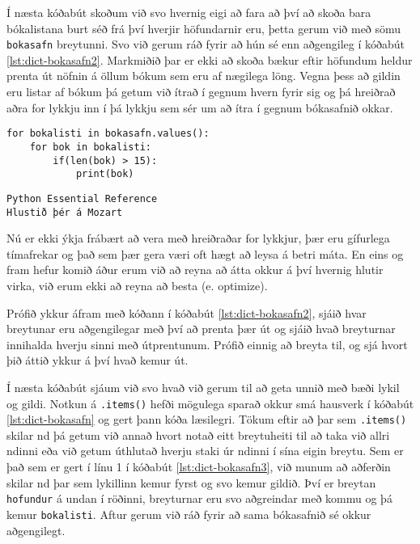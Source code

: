 Í næsta kóðabút skoðum við svo hvernig eigi að fara að því að skoða bara bókalistana burt séð frá því hverjir höfundarnir eru, þetta gerum við með sömu \texttt{bokasafn} breytunni.
Svo við gerum ráð fyrir að hún sé enn aðgengileg í kóðabút \ref{lst:dict-bokasafn2}.
Markmiðið þar er ekki að skoða bækur eftir höfundum heldur prenta út nöfnin á öllum bókum sem eru af nægilega löng.
Vegna þess að gildin eru listar af bókum þá getum við ítrað í gegnum hvern fyrir sig og þá hreiðrað aðra for lykkju inn í þá lykkju sem sér um að ítra í gegnum bókasafnið okkar.
		
\begin{lstlisting}[caption=Ítrun í gegnum orðabækur með .values(), label=lst:dict-bokasafn2]
for bokalisti in bokasafn.values():
	for bok in bokalisti:
		if(len(bok) > 15):
			print(bok)
\end{lstlisting}
\lstset{style=uttak}
\begin{lstlisting}
Python Essential Reference
Hlustið þér á Mozart
\end{lstlisting}
\lstset{style=venjulegt}

Nú er ekki ýkja frábært að vera með hreiðraðar for lykkjur, þær eru gífurlega tímafrekar og það sem þær gera væri oft hægt að leysa á betri máta.
En eins og fram hefur komið áður erum við að reyna að átta okkur á því hvernig hlutir virka, við erum ekki að reyna að besta (e. optimize).

Prófið ykkur áfram með kóðann í kóðabút \ref{lst:dict-bokasafn2}, sjáið hvar breytunar eru aðgengilegar með því að prenta þær út og sjáið hvað breyturnar innihalda hverju sinni með útprentunum.
Prófið einnig að breyta til, og sjá hvort þið áttið ykkur á því hvað kemur út.

Í næsta kóðabút sjáum við svo hvað við gerum til að geta unnið með bæði lykil og gildi.
Notkun á \texttt{.items()} hefði mögulega sparað okkur smá hausverk í kóðabút \ref{lst:dict-bokasafn} og gert þann kóða læsilegri.
Tökum eftir að þar sem \texttt{.items()} skilar nd þá getum við annað hvort notað eitt breytuheiti til að taka við allri ndinni eða við getum úthlutað hverju staki úr ndinni í sína eigin breytu.
Sem er það sem er gert í línu 1 í kóðabút \ref{lst:dict-bokasafn3}, við munum að aðferðin skilar nd þar sem lykillinn kemur fyrst og svo kemur gildið.
Því er breytan \texttt{hofundur} á undan í röðinni, breyturnar eru svo aðgreindar með kommu og þá kemur \texttt{bokalisti}.
Aftur gerum við ráð fyrir að sama bókasafnið sé okkur aðgengilegt.

